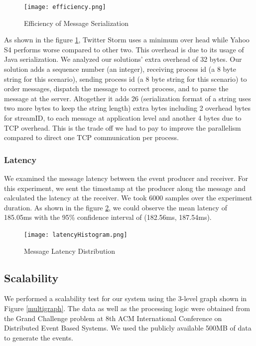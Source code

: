 \begin{figure}[!t]
        \centering
        \texttt{[image: efficiency.png]}
        \caption{Efficiency of Message Serialization}
        \label{efficiency}
\end{figure}

As shown in the figure \ref{efficiency}, Twitter Storm \cite{twitterStorm} uses a minimum over head while Yahoo S4 \cite{neumeyer2010s4} performs worse compared to other two. This overhead is due to its usage of Java serialization. We analyzed our solutions' extra overhead of 32 bytes. Our solution adds a sequence number (an integer), receiving process id (a 8 byte string for this scenario), sending process id (a 8 byte string for this scenario) to order messages, dispatch the message to correct process, and to parse the message at the server. Altogether it adds 26 (serialization format of a string uses two more bytes to keep the string length) extra bytes including 2 overhead bytes for streamID, to each message at application level and another 4 bytes due to TCP overhead. This is the trade off we had to pay to improve the parallelism compared to direct one TCP communication per process. 

\subsubsection{Latency}
We examined the message latency between the event producer and receiver. For this experiment, we sent the timestamp at the producer along the message and calculated the latency at the receiver. We took 6000 samples over the experiment duration. As shown in the figure \ref{latancydis}, we could observe the mean latency of 185.05ms with the 95\% confidence interval of (182.56ms, 187.54ms). 

\begin{figure}[!t]
        \centering
        \texttt{[image: latencyHistogram.png]}
        \caption{Message Latency Distribution}
        \label{latancydis}
\end{figure}


\subsection{Scalability}
We performed a scalability test for our system using the 3-level graph shown in Figure \ref{multigraph}. The data as well as the processing logic were obtained from the Grand Challenge problem at 8th ACM International Conference on Distributed Event Based Systems. We used the publicly available 500MB of data to generate the events. 

